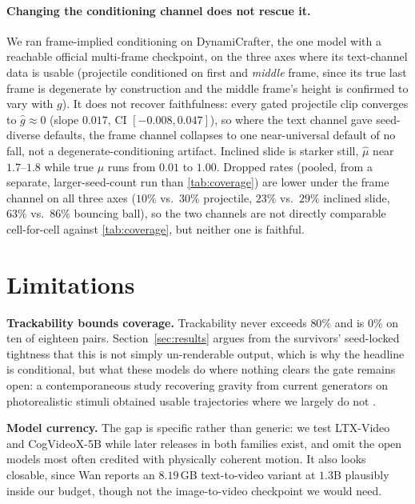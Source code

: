 \documentclass[10pt,twocolumn,letterpaper]{article}
\begin{document}
\paragraph{Changing the conditioning channel does not rescue it.}
We ran frame-implied conditioning on DynamiCrafter, the one model with a
reachable official multi-frame checkpoint, on the three axes where its
text-channel data is usable (projectile conditioned on first and
\emph{middle} frame, since its true last frame is degenerate by
construction and the middle frame's height is confirmed to vary with $g$).
It does not recover faithfulness: every gated projectile clip converges to
$\hat g\approx0$ (slope $0.017$, CI $[-0.008,0.047]$), so where the text
channel gave seed-diverse defaults, the frame channel collapses to one
near-universal default of no fall, not a degenerate-conditioning artifact.
Inclined slide is starker still, $\hat\mu$ near $1.7$--$1.8$ while true
$\mu$ runs from $0.01$ to $1.00$. Dropped rates (pooled, from a separate,
larger-seed-count run than \autoref{tab:coverage}) are lower under the
frame channel on all three axes ($10\%$ vs.\ $30\%$ projectile, $23\%$
vs.\ $29\%$ inclined slide, $63\%$ vs.\ $86\%$ bouncing ball), so the two
channels are not directly comparable cell-for-cell against
\autoref{tab:coverage}, but neither one is faithful.
\section{Limitations}
\label{sec:limitations}

\textbf{Trackability bounds coverage.} Trackability never exceeds $80\%$
and is $0\%$ on ten of eighteen pairs. Section~\ref{sec:results} argues
from the survivors' seed-locked tightness that this is not simply
un-renderable output, which is why the headline is conditional, but what
these models do where nothing clears the gate remains open: a
contemporaneous study recovering gravity from current generators on
photorealistic stimuli obtained usable trajectories where we largely do
not \citep{thozhiyoor2026gravity}.

\textbf{Model currency.} The gap is specific rather than generic: we test
LTX-Video and CogVideoX-5B while later releases in both families exist,
and omit the open models most often credited with physically coherent
motion. It also looks closable, since Wan reports an $8.19$\,GB
text-to-video variant at $1.3$B \citep{wan2025} plausibly inside our
budget, though not the image-to-video checkpoint we would need.
\end{document}
